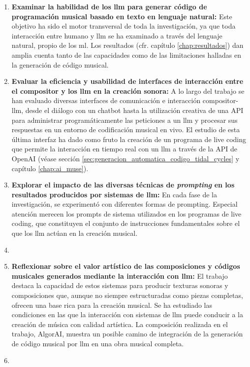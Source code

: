\begin{enumerate}[label=\alph*)]
    \item \textbf{Examinar la habilidad de los \gls{llm} para generar código de programación musical basado en texto en lenguaje natural:} Este objetivo ha sido el motor transversal de toda la investigación, ya que toda interacción entre humano y \gls{llm} se ha examinado a través del lenguaje natural, propio de los \gls{ml}. Los resultados (cfr. capítulo \ref{chap:resultados}) dan amplia cuenta tanto de las capacidades como de las limitaciones halladas en la generación de código musical.
    

    \item \textbf{Evaluar la eficiencia y usabilidad de interfaces de interacción entre el compositor y los \gls{llm} en la creación sonora:} A lo largo del trabajo se han evaluado diversas interfaces de comunicación e interacción compositor-\gls{llm}, desde el diálogo con un chatbot hasta la utilización creativa de una API para administrar programáticamente las peticiones a un \gls{llm} y procesar sus respuestas en un entorno de codificación musical en vivo. El estudio de esta última interfaz ha dado como fruto la creación de un programa de live coding que permite la interacción en tiempo real con un \gls{llm} a través de la API de OpenAI (véase sección \ref{sec:generacion_automatica_codigo_tidal_cycles} y capítulo \ref{chap:ai_muse}).
    

    \item \textbf{Explorar el impacto de las diversas técnicas de \emph{prompting} en los resultados producidos por sistemas de \gls{llm}:} En cada fase de la investigación, se experimentó con diferentes formas de prompting. Especial atención merecen los prompts de sistema utilizados en los programas de live coding, que constituyen el conjunto de instrucciones fundamentales sobre el que los \gls{llm} actúan en la creación musical.
    \item 
    
    
    \item \textbf{Reflexionar sobre el valor artístico de las composiciones y códigos musicales generados mediante la interacción con \gls{llm}:}  El trabajo destaca la capacidad de estos sistemas para producir texturas sonoras y composiciones que, aunque no siempre estructuradas como piezas completas, ofrecen una base rica para la creación musical. Se ha estudiado las condiciones en las que la interacción con sistemas de \gls{llm} puede conducir a la creación de música con calidad artística. La composición realizada en el trabajo, AlgorAI, muestra un posible camino de integración de la generación de código musical por \gls{llm} en una obra musical completa.
    \item 
    

\end{enumerate}
